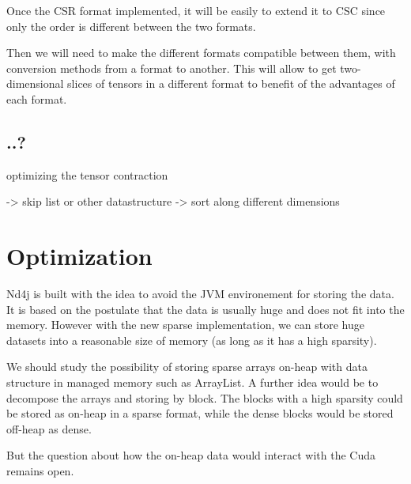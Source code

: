 Once the CSR format implemented, it will be easily to extend it to CSC since only the order is different between the two formats.

Then we will need to make the different formats compatible between them, with conversion methods from a format to another. This will allow to get two-dimensional slices of tensors in a different format to benefit of the advantages of each format.

\subsection{ ..?}
optimizing the tensor contraction

-> skip list or other datastructure 
-> sort along different dimensions



\section{Optimization}
Nd4j is built with the idea to avoid the JVM environement for storing the data. It is based on the postulate that the data is usually huge and does not fit into the memory. However with the new sparse implementation, we can store huge datasets into a reasonable size of memory (as long as it has a high sparsity).

We should study the possibility of storing sparse arrays on-heap with data structure in managed memory such as ArrayList. A further idea would be to decompose the arrays and storing by block. The blocks with a high sparsity could be stored as on-heap in a sparse format, while the dense blocks would be stored off-heap as dense.

But the question about how the on-heap data would interact with the Cuda remains open.